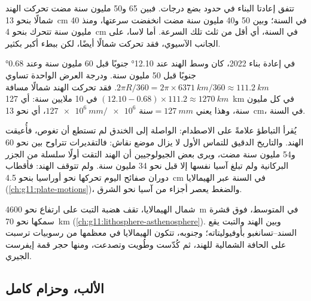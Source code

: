 تتفق إعادتا البناء في حدود بضع درجات. فبين 65 و50 مليون
سنة مضت تحركت الهند شمالًا بنحو \qty{13}{cm} في السنة؛ وبين 50 و40
مليون سنة مضت انخفضت سرعتها،
ومنذ 40 مليون سنة تتحرك بنحو \qty{4}{cm} في السنة، أي أقل
من ثلث تلك السرعة. أما لاسا، على الجانب الآسيوي، فقد تحركت شمالًا أيضًا، لكن
ببطء أكبر بكثير.

\begin{example}\label{ex:g12:mountain-building:india}
في إعادة بناء 2022، كان وسط الهند عند \ang{12.10} جنوبًا قبل 60 مليون
سنة وعند \ang{0.68} جنوبًا قبل 50 مليون سنة. ودرجة العرض الواحدة تساوي
$2\pi R/360 = 2\pi \times \qty{6371}{km}/360 \approx \qty{111.2}{km}$. فقد
تحركت الهند شمالًا مسافة $(12.10 - 0.68) \times 111.2 \approx \qty{1270}{km}$ في 10
ملايين سنة: أي \qty{127}{km} في كل مليون سنة، وهذا يعني $\qty{127e6}{mm} /
\num{e6}\text{ سنة} = \qty{127}{mm}$، أي نحو \qty{13}{cm}، في السنة.
\end{example}

يُقرأ التباطؤ علامةً على الاصطدام: 
الواصلة إلى الخندق لم تستطع أن تغوص، فأُعيقت الهند. والتاريخ الدقيق للتماس الأول لا يزال موضع نقاش: فالتقديرات
تتراوح بين نحو 60 و54 مليون سنة مضت، ويرى بعض الجيولوجيين أن
الهند التقت أولًا سلسلة من الجزر البركانية ولم تبلغ آسيا نفسها إلا
قبل نحو 34 مليون سنة. ولم تتوقف الهند: فأقطاب دوران
صفائح اليوم تحركها نحو أوراسيا بنحو \qty{4.5}{cm} في السنة عبر
الهيمالايا (\cref{ch:g11:plate-motions})، والضغط يعصر أجزاء من
آسيا نحو الشرق.

شمال الهيمالايا، تقف هضبة التبت على ارتفاع نحو \qty{4600}{m} في
المتوسط، فوق قشرة سمكها نحو \qty{70}{km}
(\cref{ch:g11:lithosphere-asthenosphere}). وبين الهند والتبت يقع
 السند--تسانغبو بأوفيوليتاته؛ وجنوبه، تتكون الهيمالايا
في معظمها من رسوبيات ترسبت على الحافة الشمالية للهند، ثم كُدّست
وطُويت وتصدعت، ومنها حجر قمة إيفرست الجيري.

\subsection{الألب، وحزام كامل}

